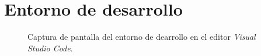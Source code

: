 \section{Entorno de desarrollo}\label{sec:entorno}

\begin{figure}[htbp]
	\centerline{}
	\caption*{Captura de pantalla del entorno de dearrollo en el editor \textit{Visual Studio Code}.}
	\label{figure:entorno}
\end{figure}









